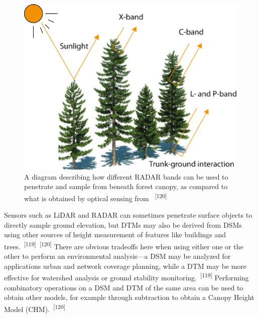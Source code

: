 \documentclass{article}
\begin{document}

\begin{figure}
    \centering
    \includegraphics[width=0.8\linewidth]{images/canopy-penetration.png}
    \caption{A diagram describing how different RADAR bands can be used to penetrate and sample from beneath forest canopy, as compared to what is obtained by optical sensing from ~\textsuperscript{[120]}}
    \label{figure32}
\end{figure}


\par{Sensors such as LiDAR and RADAR can sometimes penetrate surface objects to directly sample ground elevation, but DTMs may also be derived from DSMs using other sources of height measurement of features like buildings and trees.~\textsuperscript{[119]}~\textsuperscript{[120]} There are obvious tradeoffs here when using either one or the other to perform an environmental analysis---a DSM may be analyzed for applications urban and network coverage planning, while a DTM may be more effective for watershed analysis or ground stability monitoring.~\textsuperscript{[119]} Performing combinatory operations on a DSM and DTM of the same area can be used to obtain other models, for example through subtraction to obtain a Canopy Height Model (CHM).~\textsuperscript{[120]}}

\end{document}
